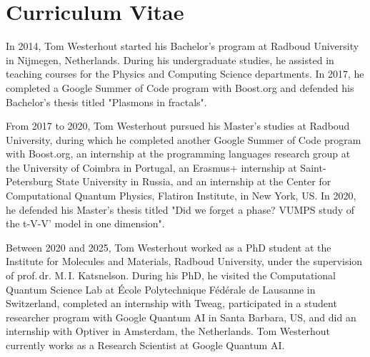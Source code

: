 \openright\chapter{Curriculum Vitae}

In 2014, Tom Westerhout started his Bachelor's program at Radboud University in Nijmegen, Netherlands. During his undergraduate studies, he assisted in teaching courses for the Physics and Computing Science departments. In 2017, he completed a Google Summer of Code program with Boost.org and defended his Bachelor's thesis titled "Plasmons in fractals". 

From 2017 to 2020, Tom Westerhout pursued his Master's studies at Radboud University, during which he completed another Google Summer of Code program with Boost.org, an internship at the programming languages research group at the University of Coimbra in Portugal, an Erasmus+ internship at Saint-Petersburg State University in Russia, and an internship at the Center for Computational Quantum Physics, Flatiron Institute, in New York, US. In 2020, he defended his Master's thesis titled "Did we forget a phase? VUMPS study of the t-V-V' model in one dimension". 

Between 2020 and 2025, Tom Westerhout worked as a PhD student at the Institute for Molecules and Materials, Radboud University, under the supervision of prof.\,dr. M.\,I. Katsnelson. During his PhD, he visited the Computational Quantum Science Lab at École Polytechnique Fédérale de Lausanne in Switzerland, completed an internship with Tweag, participated in a student researcher program with Google Quantum AI in Santa Barbara, US, and did an internship with Optiver in Amsterdam, the Netherlands. Tom Westerhout currently works as a Research Scientist at Google Quantum AI.

